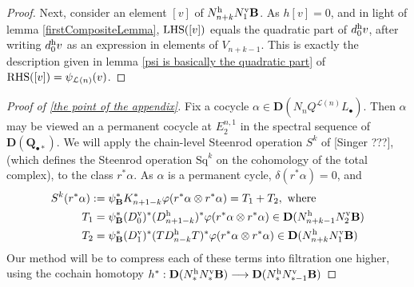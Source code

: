 \documentclass[11pt]{amsart}
\theoremstyle{plain}
\theoremstyle{definition}
\let\oldphi\phi
\let\phi\varphi
\renewcommand{\to}{\longrightarrow}
\newcommand{\calL}{\mathcal{L}}
\theoremstyle{plain}
\newcommand{\Sq}{\mathrm{Sq}}
\newcommand{\dual}{\mathbf{D}}
\begin{document}
\begin{appendices}
\begin{proof}
Next, consider an element $[v]$ of $N_{n+k}^\textup{h}N_1^\textup{v}\textbf{B}$. As $h[v]=0$, and in light of lemma \ref{firstCompositeLemma}, $\textup{LHS}([v])$ equals the quadratic part of $d_0^\textup{h}v$, after writing $d_0^\textup{h}v$ as an expression in elements of $V_{n+k-1}$. This is exactly the description given in lemma \ref{psi is basically the quadratic part} of $\textup{RHS}([v])=\psi_{\calL(n)}(v)$.
\end{proof}
\begin{proof}[Proof of \ref{the point of the appendix}]
Fix a cocycle $\alpha\in \dual(N_{n}Q^{\calL(n)} L_\bullet)$. %
Then $\alpha$ may be viewed an a permanent cocycle at $E_2^{n,1}$ in the spectral sequence of $\dual(\textbf{Q}_{\bullet*})$. We will apply the chain-level Steenrod operation $S^k$ of [Singer ???], (which defines the Steenrod operation $\Sq^k$ on the cohomology of the total complex), to the class $r^*\alpha$. As $\alpha$ is a permanent cycle, $\delta(r^*\alpha)=0$, and
\begin{alignat*}{2}
S^k(r^*\alpha):={}&\psi_{\textup{\textbf{B}}}^*K^*_{n+1-k}\oldphi(r^*\alpha\otimes r^*\alpha)=T_1+T_2,\textup{ where}
\\
T_1
={}&
\psi_{\textup{\textbf{B}}}^*(D^\textup{v}_0)^*(D^\textup{h}_{n+1-k})^*
\oldphi(r^*\alpha\otimes r^*\alpha)\in \dual(N^\textup{h}_{n+k-1}N^\textup{v}_2\textbf{B})%
\\
T_2
={}&
\psi_{\textup{\textbf{B}}}^*(D^\textup{v}_1)^*(TD^\textup{h}_{n-k}T)^*
\oldphi(r^*\alpha\otimes r^*\alpha)\in \dual(N^\textup{h}_{n+k}N^\textup{v}_1\textbf{B})
\end{alignat*}
%
Our method will be to compress each of these terms into filtration one higher, using the cochain homotopy $h^*:\dual(N^\textup{h}_* N^\textup{v}_*\textbf{B})\to \dual(N^\textup{h}_*N^\textup{v}_{*-1}\textbf{B})$

\end{proof}
\end{appendices}
\end{document}
